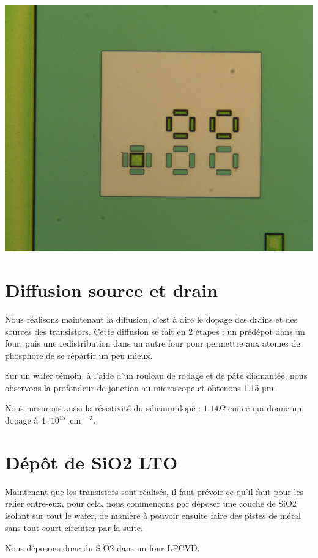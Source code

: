 \documentclass{article}
\begin{document}
\includegraphics[width=\linewidth]{mire_poly.png}

\section{Diffusion source et drain}

Nous réalisons maintenant la diffusion, c’est à dire le dopage des drains et des sources des transistors. Cette diffusion se fait en 2 étapes : un prédépot dans un four, puis une redistribution dans un autre four pour permettre aux atomes de phosphore de se répartir un peu mieux.

Sur un wafer témoin, à l’aide d’un rouleau de rodage et de pâte diamantée, nous observons la profondeur de jonction au microscope et obtenons 1.15 µm.

Nous mesurons aussi la résistivité du silicium dopé : $1.14 \Omega$ cm ce qui donne un dopage à $4\cdot10^{15}$~cm~$^{-3}$.

\section{Dépôt de SiO2 LTO}

Maintenant que les transistors sont réalisés, il faut prévoir ce qu’il faut pour les relier entre-eux, pour cela, nous commençons par déposer une couche de SiO2 isolant sur tout le wafer, de manière à pouvoir ensuite faire des pistes de métal sans tout court-circuiter par la suite.

Nous déposons donc du SiO2 dans un four LPCVD.
\end{document}
